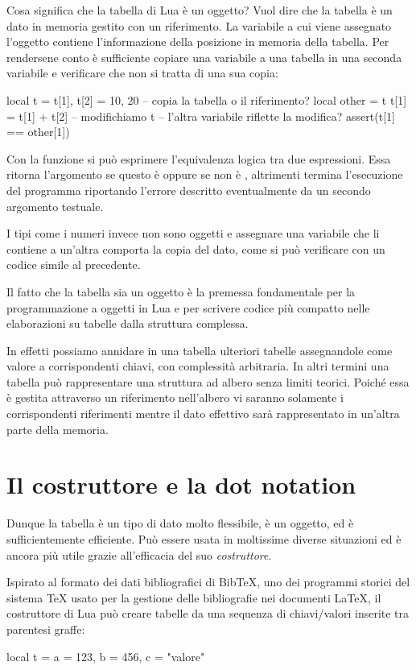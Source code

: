 Cosa significa che la tabella di Lua è un oggetto? Vuol dire che la tabella è un
dato in memoria gestito con un riferimento. La variabile a cui viene assegnato
l'oggetto contiene l'informazione della posizione in memoria della tabella. Per
rendersene conto è sufficiente copiare una variabile a una tabella in una
seconda variabile e verificare che non si tratta di una sua copia:
\begin{lines}
local t = {}
t[1], t[2] = 10, 20
-- copia la tabella o il riferimento?
local other = t
t[1] = t[1] + t[2] -- modifichiamo t
-- l'altra variabile riflette la modifica?
assert(t[1] == other[1])
\end{lines}

Con la funzione  si può esprimere l'equivalenza logica tra due
espressioni. Essa ritorna l'argomento se questo è  oppure se non è
, altrimenti termina l'esecuzione del programma riportando l'errore
descritto eventualmente da un secondo argomento testuale.

I tipi come i numeri invece non sono oggetti e assegnare una variabile che li
contiene a un'altra comporta la copia del dato, come si può verificare con un
codice simile al precedente.

Il fatto che la tabella sia un oggetto è la premessa fondamentale per la
programmazione a oggetti in Lua e per scrivere codice più compatto nelle
elaborazioni su tabelle dalla struttura complessa.

In effetti possiamo annidare in una tabella ulteriori tabelle assegnandole come
valore a corrispondenti chiavi, con complessità arbitraria. In altri termini una
tabella può rappresentare una struttura ad albero senza limiti teorici. Poiché
essa è gestita attraverso un riferimento nell'albero vi saranno solamente i
corrispondenti riferimenti mentre il dato effettivo sarà rappresentato in
un'altra parte della memoria.


\section{Il costruttore e la dot notation}

Dunque la tabella è un tipo di dato molto flessibile, è un oggetto, ed è
sufficientemente efficiente. Può essere usata in moltissime diverse situazioni
ed è ancora più utile grazie all'efficacia del suo \emph{costruttore}.

Ispirato al formato dei dati bibliografici di BibTeX, uno dei programmi storici
del sistema \TeX{} usato per la gestione delle bibliografie nei documenti
\LaTeX, il costruttore di Lua può creare tabelle da una sequenza di
chiavi/valori inserite tra parentesi graffe:
\begin{lines}
local t = { a = 123, b = 456, c = "valore" }
\end{lines}

